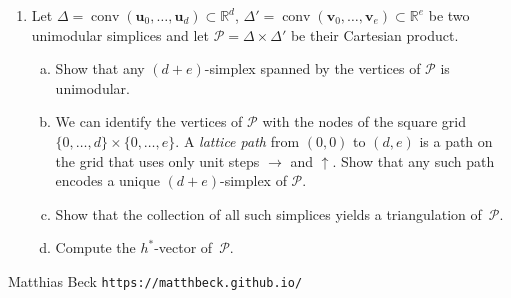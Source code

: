\documentclass[11pt]{article}
\def\v{\mathbf{v}}
\def\u{\mathbf{u}}
\def\cP{\mathcal{P}}
\def\RR{\mathbb{R}}
\newcommand\conv{\operatorname{conv}}
\begin{document}
\begin{enumerate}[(1)]
\item    Let $\Delta = \conv(\u_0,\dots,\u_{d}) \subset \RR^{d}$, $\Delta' =
    \conv(\v_0,\dots,\v_{e}) \subset \RR^{e}$ be two unimodular simplices
    and let $\cP = \Delta \times \Delta'$ be their Cartesian product.
    \begin{enumerate}[(a)]
        \item Show that any $(d+e)$-simplex spanned by the vertices of $\cP$
            is unimodular.
        \item We can identify the vertices of $\cP$ with the nodes of the
            square grid $\{0,\dots,d\} \times \{0,\dots,e\}$.  A
            \emph{lattice path} from $(0,0)$ to $(d,e)$ is a path on the
            grid that uses only unit steps $\rightarrow$ and $\uparrow$. Show
            that any such path encodes a unique $(d+e)$-simplex of $\cP$.
        \item Show that the collection of all such simplices yields a
            triangulation of~$\cP$.
        \item Compute the $h^*$-vector of~$\cP$.
    \end{enumerate}

\end{enumerate}


{\sc Matthias Beck} \hfill {\tt https://matthbeck.github.io/}

\end{document}
